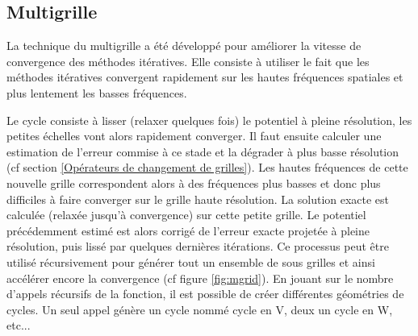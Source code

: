 \subsection{Multigrille}

La technique du multigrille a été développé pour améliorer la vitesse de convergence des méthodes itératives.
Elle consiste à utiliser le fait que les méthodes itératives convergent rapidement sur les hautes fréquences spatiales et plus lentement les basses fréquences.%

%
%

Le cycle consiste à lisser (relaxer quelques fois) le potentiel à pleine résolution, les petites échelles vont alors rapidement converger.
Il faut ensuite calculer une estimation de l'erreur commise à ce stade et la dégrader à plus basse résolution (cf section \ref{Opérateurs de changement de grilles}).
Les hautes fréquences de cette nouvelle grille correspondent alors à des fréquences plus basses et donc plus difficiles à faire converger sur le grille haute résolution. 
La solution exacte est calculée (relaxée jusqu'à convergence) sur cette petite grille.
Le potentiel précédemment estimé est alors corrigé de l'erreur exacte projetée à pleine résolution, puis lissé par quelques dernières itérations.
Ce processus peut être utilisé récursivement pour générer tout un ensemble de sous grilles et ainsi accélérer encore la convergence (cf figure \ref{fig:mgrid}).
En jouant sur le nombre d'appels récursifs de la fonction, il est possible de créer différentes géométries de cycles. 
Un seul appel génère un cycle nommé cycle en V, deux un cycle en W, etc... 

